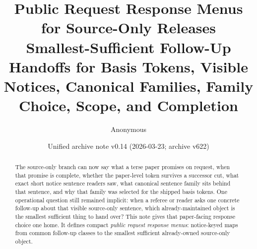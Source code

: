 \documentclass[11pt]{article}
\title{Public Request Response Menus for Source-Only Releases\\\large Smallest-Sufficient Follow-Up Handoffs for Basis Tokens, Visible Notices, Canonical Families, Family Choice, Scope, and Completion}
\author{Anonymous}
\date{Unified archive note v0.14 (2026-03-23; archive v622)}
\begin{document}
\maketitle

\begin{abstract}
The source-only branch can now say what a terse paper promises on request, when that promise is complete, whether the paper-level token survives a successor cut, what exact short notice sentence readers saw, what canonical sentence family sits behind that sentence, and why that family was selected for the shipped basis tokens. One operational question still remained implicit: when a referee or reader asks one concrete follow-up about that visible source-only sentence, which already-maintained object is the smallest sufficient thing to hand over? This note gives that paper-facing response choice one home. It defines compact \emph{public request response menus}: notice-keyed maps from common follow-up classes to the smallest sufficient already-owned source-only object.
\end{abstract}
\end{document}

